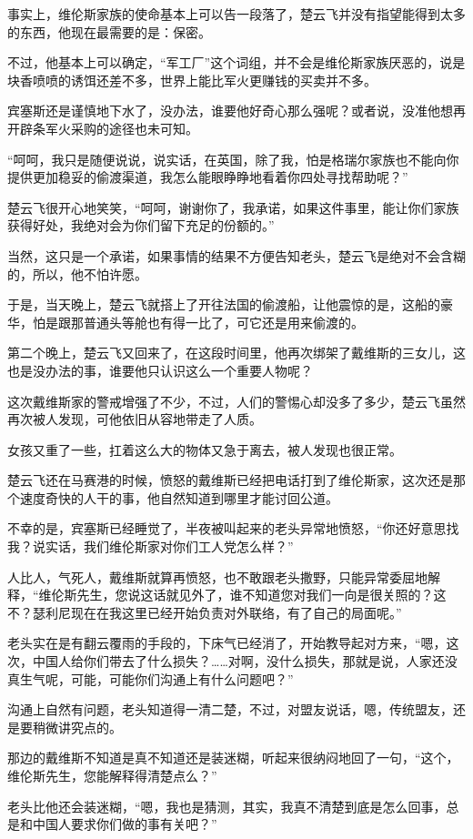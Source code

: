 事实上，维伦斯家族的使命基本上可以告一段落了，楚云飞并没有指望能得到太多的东西，他现在最需要的是：保密。

不过，他基本上可以确定，“军工厂”这个词组，并不会是维伦斯家族厌恶的，说是块香喷喷的诱饵还差不多，世界上能比军火更赚钱的买卖并不多。

宾塞斯还是谨慎地下水了，没办法，谁要他好奇心那么强呢？或者说，没准他想再开辟条军火采购的途径也未可知。

“呵呵，我只是随便说说，说实话，在英国，除了我，怕是格瑞尔家族也不能向你提供更加稳妥的偷渡渠道，我怎么能眼睁睁地看着你四处寻找帮助呢？”

楚云飞很开心地笑笑，“呵呵，谢谢你了，我承诺，如果这件事里，能让你们家族获得好处，我绝对会为你们留下充足的份额的。”

当然，这只是一个承诺，如果事情的结果不方便告知老头，楚云飞是绝对不会含糊的，所以，他不怕许愿。

于是，当天晚上，楚云飞就搭上了开往法国的偷渡船，让他震惊的是，这船的豪华，怕是跟那普通头等舱也有得一比了，可它还是用来偷渡的。

第二个晚上，楚云飞又回来了，在这段时间里，他再次绑架了戴维斯的三女儿，这也是没办法的事，谁要他只认识这么一个重要人物呢？

这次戴维斯家的警戒增强了不少，不过，人们的警惕心却没多了多少，楚云飞虽然再次被人发现，可他依旧从容地带走了人质。

女孩又重了一些，扛着这么大的物体又急于离去，被人发现也很正常。

楚云飞还在马赛港的时候，愤怒的戴维斯已经把电话打到了维伦斯家，这次还是那个速度奇快的人干的事，他自然知道到哪里才能讨回公道。

不幸的是，宾塞斯已经睡觉了，半夜被叫起来的老头异常地愤怒，“你还好意思找我？说实话，我们维伦斯家对你们工人党怎么样？”

人比人，气死人，戴维斯就算再愤怒，也不敢跟老头撒野，只能异常委屈地解释，“维伦斯先生，您说这话就见外了，谁不知道您对我们一向是很关照的？这不？瑟利尼现在在我这里已经开始负责对外联络，有了自己的局面呢。”

老头实在是有翻云覆雨的手段的，下床气已经消了，开始教导起对方来，“嗯，这次，中国人给你们带去了什么损失？……对啊，没什么损失，那就是说，人家还没真生气呢，可能，可能你们沟通上有什么问题吧？”

沟通上自然有问题，老头知道得一清二楚，不过，对盟友说话，嗯，传统盟友，还是要稍微讲究点的。

那边的戴维斯不知道是真不知道还是装迷糊，听起来很纳闷地回了一句，“这个，维伦斯先生，您能解释得清楚点么？”

老头比他还会装迷糊，“嗯，我也是猜测，其实，我真不清楚到底是怎么回事，总是和中国人要求你们做的事有关吧？”

